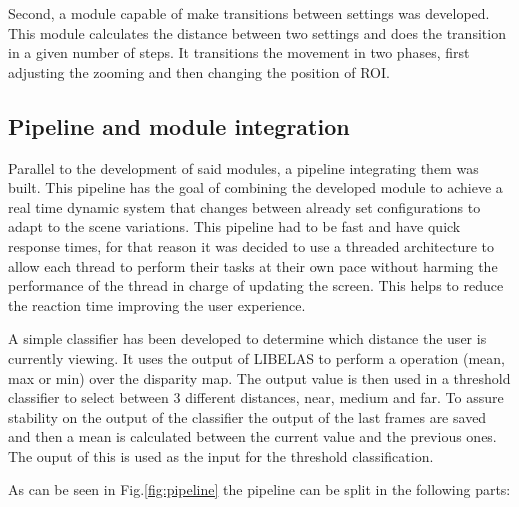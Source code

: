 \documentclass[10pt,a4paper,twocolumn,twoside]{article}
\begin{document}
	Second, a module capable of make transitions between settings was developed. This module calculates the distance between two settings and does the transition in a given number of steps. It transitions the movement in two phases, first adjusting the zooming and then changing the position of ROI.
	
	\subsection{Pipeline and module integration}
	\label{sec:pipeline}
	
	Parallel to the development of said modules, a pipeline integrating them was built. This pipeline has the goal of combining the developed module to achieve a real time dynamic system that changes between already set configurations to adapt to the scene variations. This pipeline had to be fast and have quick response times, for that reason it was decided to use a threaded architecture to allow each thread to perform their tasks at their own pace without harming the performance of the thread in charge of updating the screen. This helps to reduce the reaction time improving the user experience. 
	
	A simple classifier has been developed to determine which distance the user is currently viewing. It uses the output of LIBELAS to perform a operation (mean, max or min) over the disparity map. The output value is then used in a threshold classifier to select between 3 different distances, near, medium and far. 
	To assure stability on the output of the classifier the output of the last frames are saved and then a mean is calculated between the current value and the previous ones. The ouput of this  is used as the input for the threshold classification. 
	
	As can be seen in Fig.\ref{fig:pipeline} the pipeline can be split in the following parts: 
	
\end{document}
